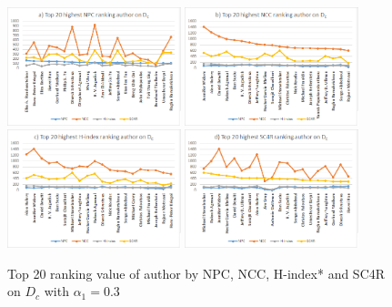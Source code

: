 \documentclass[10pt,leqno,twoside]{article}
\begin{document}
\begin{figure} %
	\caption{Top 20 ranking value of author by NPC, NCC, H-index* and SC4R on $D_c$ with $\alpha_1=0.3$}
	\label{Fig:Top20AuthorDc}
    \centering
    \includegraphics[width=0.45\textwidth]{Dct20NPCa}
    \includegraphics[width=0.45\textwidth]{Dct20NCCa}
    \includegraphics[width=0.45\textwidth]{Dct20HINDEXa}
    \includegraphics[width=0.45\textwidth]{Dct20SC4Ra}
\end{figure}
\end{document}
